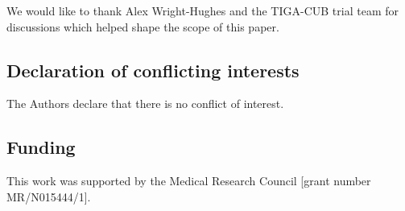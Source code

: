 \documentclass[AMA,STIX1COL]{WileyNJD-v2}
\begin{document}
We would like to thank Alex Wright-Hughes and the TIGA-CUB trial team for discussions which helped shape the scope of this paper.

\subsection*{Declaration of conflicting interests}

The Authors declare that there is no conflict of interest.

\subsection*{Funding}

This work was supported by the Medical Research Council [grant number MR/N015444/1].

%


\appendix
\end{document}
